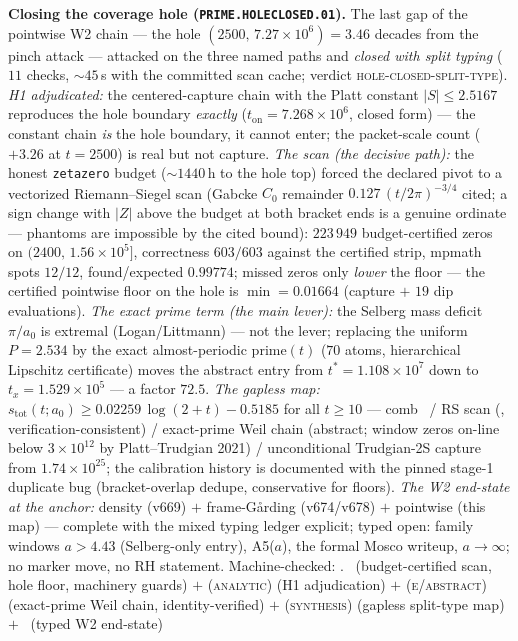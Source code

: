 \documentclass[11pt,a4paper]{article}
\theoremstyle{definition}
\begin{document}
\par\smallskip\noindent\textbf{Closing the coverage hole
(\texttt{PRIME.HOLECLOSED.01}).}
The last gap of the pointwise W2 chain --- the hole
$(2500,\,7.27\times10^{6})=3.46$ decades from the pinch attack ---
attacked on the three named paths and \emph{closed with split
typing} ($11$ checks, ${\sim}45$\,s with the committed scan cache;
verdict \textsc{hole-closed-split-type}).  \emph{H1 adjudicated:}
the centered-capture chain with the Platt constant $|S|\le2.5167$
reproduces the hole boundary \emph{exactly}
($t_{\mathrm{on}}=7.268\times10^{6}$, closed form) --- the constant
chain \emph{is} the hole boundary, it cannot enter; the packet-scale
count ($+3.26$ at $t=2500$) is real but not capture.  \emph{The
scan (the decisive path):} the honest \texttt{zetazero} budget
(${\sim}1440$\,h to the hole top) forced the declared pivot to a
vectorized Riemann--Siegel scan (Gabcke $C_0$ remainder
$0.127\,(t/2\pi)^{-3/4}$ cited; a sign change with $|Z|$ above the
budget at both bracket ends is a genuine ordinate --- phantoms are
impossible by the cited bound): $223\,949$ budget-certified zeros on
$(2400,\,1.56\times10^{5}]$, correctness $603/603$ against the
certified strip, mpmath spots $12/12$, found/expected $0.99774$;
missed zeros only \emph{lower} the floor --- the certified pointwise
floor on the hole is $\min=0.01664$ (capture $+$ $19$ dip
evaluations).  \emph{The exact prime term (the main lever):} the
Selberg mass deficit $\pi/a_0$ is extremal (Logan/Littmann) --- not
the lever; replacing the uniform $P=2.534$ by the exact
almost-periodic $\mathrm{prime}(t)$ ($70$ atoms, hierarchical
Lipschitz certificate) moves the abstract entry from
$t^*=1.108\times10^{7}$ down to $t_x=1.529\times10^{5}$ --- a factor
$72.5$.  \emph{The gapless map:}
$s_{\mathrm{tot}}(t;a_0)\ge0.02259\,\log(2+t)-0.5185$ for all
$t\ge10$ --- comb \mE\ / RS scan (\mE, verification-consistent) /
exact-prime Weil chain (abstract; window zeros on-line below
$3\times10^{12}$ by Platt--Trudgian 2021) / unconditional
Trudgian-2S capture from $1.74\times10^{25}$; the calibration
history is documented with the pinned stage-1 duplicate bug
(bracket-overlap dedupe, conservative for floors).  \emph{The W2
end-state at the anchor:} density (v669) $+$ frame-G\aa rding
(v674/v678) $+$ pointwise (this map) --- complete with the mixed
typing ledger explicit; typed open: family windows $a>4.43$
(Selberg-only entry), A5($a$), the formal Mosco writeup,
$a\to\infty$; no marker move, no RH statement.
Machine-checked: .
\mE\ (budget-certified scan, hole floor, machinery guards) $+$
(\textsc{analytic}) (H1 adjudication) $+$ (\textsc{e/abstract})
(exact-prime Weil chain, identity-verified) $+$
(\textsc{synthesis}) (gapless split-type map) $+$ \mC\ (typed W2
end-state)
\par\smallskip
\end{document}
